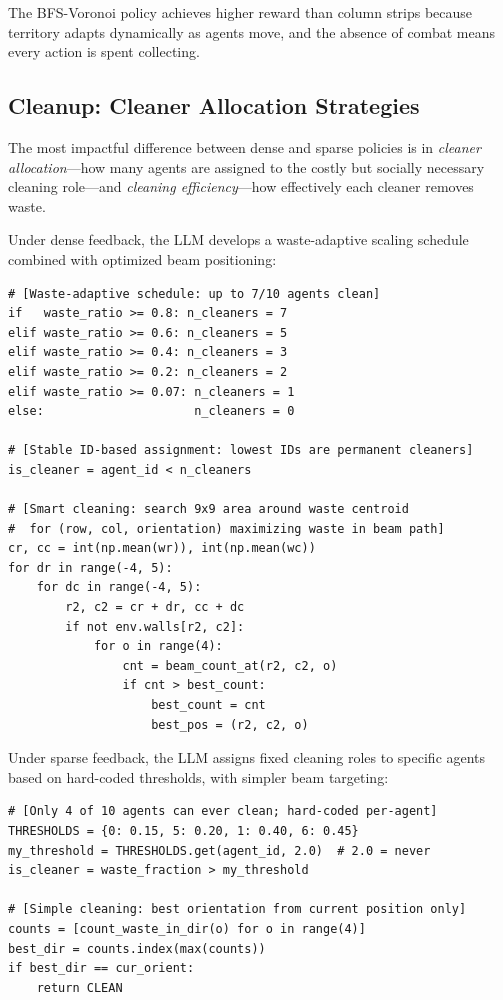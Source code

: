 \documentclass{nextgame2026} %
\begin{document}
The BFS-Voronoi policy achieves higher reward than column strips
because territory adapts dynamically as agents move, and the absence
of combat means every action is spent collecting.

\subsection{Cleanup: Cleaner Allocation Strategies}
\label{app:cleanup}

The most impactful difference between dense and sparse policies is in
\emph{cleaner allocation}---how many agents are assigned to the costly
but socially necessary cleaning role---and \emph{cleaning efficiency}---how
effectively each cleaner removes waste.

Under dense feedback, the LLM develops a waste-adaptive scaling schedule
combined with optimized beam positioning:

\begin{lstlisting}[style=pysmall, caption={Cleanup --- dense feedback (adaptive scaling + optimal beam positioning).}]
# [Waste-adaptive schedule: up to 7/10 agents clean]
if   waste_ratio >= 0.8: n_cleaners = 7
elif waste_ratio >= 0.6: n_cleaners = 5
elif waste_ratio >= 0.4: n_cleaners = 3
elif waste_ratio >= 0.2: n_cleaners = 2
elif waste_ratio >= 0.07: n_cleaners = 1
else:                     n_cleaners = 0

# [Stable ID-based assignment: lowest IDs are permanent cleaners]
is_cleaner = agent_id < n_cleaners

# [Smart cleaning: search 9x9 area around waste centroid
#  for (row, col, orientation) maximizing waste in beam path]
cr, cc = int(np.mean(wr)), int(np.mean(wc))
for dr in range(-4, 5):
    for dc in range(-4, 5):
        r2, c2 = cr + dr, cc + dc
        if not env.walls[r2, c2]:
            for o in range(4):
                cnt = beam_count_at(r2, c2, o)
                if cnt > best_count:
                    best_count = cnt
                    best_pos = (r2, c2, o)
\end{lstlisting}\label{listing:3}

Under sparse feedback, the LLM assigns fixed cleaning roles to
specific agents based on hard-coded thresholds, with simpler beam
targeting:

\begin{lstlisting}[style=pysmall, caption={Cleanup --- sparse feedback (fixed agent-specific thresholds).}]
# [Only 4 of 10 agents can ever clean; hard-coded per-agent]
THRESHOLDS = {0: 0.15, 5: 0.20, 1: 0.40, 6: 0.45}
my_threshold = THRESHOLDS.get(agent_id, 2.0)  # 2.0 = never
is_cleaner = waste_fraction > my_threshold

# [Simple cleaning: best orientation from current position only]
counts = [count_waste_in_dir(o) for o in range(4)]
best_dir = counts.index(max(counts))
if best_dir == cur_orient:
    return CLEAN
\end{lstlisting}
\end{document}
